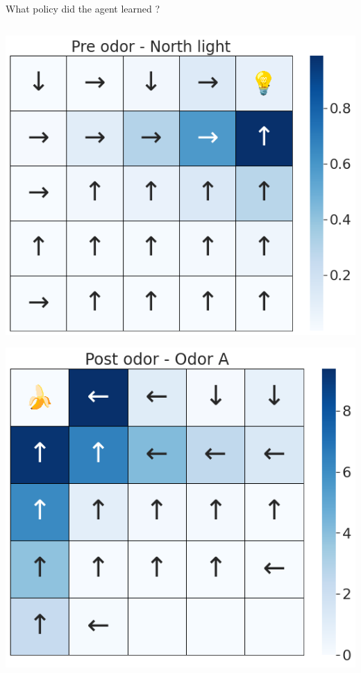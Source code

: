 \documentclass[bigger]{beamer}
\begin{document}
\begin{frame}[label={sec:orgfd1915a}]{What policy did the agent learned ?}
\begin{columns}
\begin{column}[t]{0.5\columnwidth}
\begin{center}
\includegraphics[height=0.4\textheight]{img/policy-allo-north-light.png}
\end{center}
\begin{center}
\includegraphics[height=0.4\textheight]{img/policy-allo-odor-A.png}

\end{center}
\end{column}
\end{columns}
\end{frame}
\end{document}
